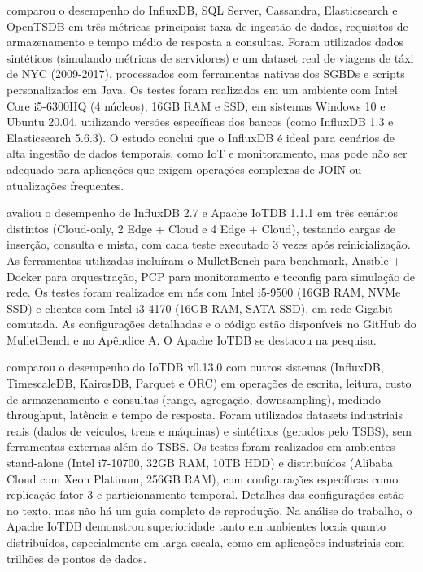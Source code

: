  comparou o desempenho do InfluxDB, SQL Server, Cassandra, Elasticsearch e OpenTSDB em três métricas principais: taxa de ingestão de dados, requisitos de armazenamento e tempo médio de resposta a consultas. Foram utilizados dados sintéticos (simulando métricas de servidores) e um dataset real de viagens de táxi de NYC (2009-2017), processados com ferramentas nativas dos SGBDs e scripts personalizados em Java. Os testes foram realizados em um ambiente com Intel Core i5-6300HQ (4 núcleos), 16GB RAM e SSD, em sistemas Windows 10 e Ubuntu 20.04, utilizando versões específicas dos bancos (como InfluxDB 1.3 e Elasticsearch 5.6.3). O estudo conclui que o InfluxDB é ideal para cenários de alta ingestão de dados temporais, como IoT e monitoramento, mas pode não ser adequado para aplicações que exigem operações complexas de JOIN ou atualizações frequentes.

 avaliou o desempenho de InfluxDB 2.7 e Apache IoTDB 1.1.1 em três cenários distintos (Cloud-only, 2 Edge + Cloud e 4 Edge + Cloud), testando cargas de inserção, consulta e mista, com cada teste executado 3 vezes após reinicialização. As ferramentas utilizadas incluíram o MulletBench para benchmark, Ansible + Docker para orquestração, PCP para monitoramento e tcconfig para simulação de rede. Os testes foram realizados em nós com Intel i5-9500 (16GB RAM, NVMe SSD) e clientes com Intel i3-4170 (16GB RAM, SATA SSD), em rede Gigabit comutada. As configurações detalhadas e o código estão disponíveis no GitHub do MulletBench e no Apêndice A. O Apache IoTDB se destacou na pesquisa.

 comparou o desempenho do IoTDB v0.13.0 com outros sistemas (InfluxDB, TimescaleDB, KairosDB, Parquet e ORC) em operações de escrita, leitura, custo de armazenamento e consultas (range, agregação, downsampling), medindo throughput, latência e tempo de resposta. Foram utilizados datasets industriais reais (dados de veículos, trens e máquinas) e sintéticos (gerados pelo TSBS), sem ferramentas externas além do TSBS. Os testes foram realizados em ambientes stand-alone (Intel i7-10700, 32GB RAM, 10TB HDD) e distribuídos (Alibaba Cloud com Xeon Platinum, 256GB RAM), com configurações específicas como replicação fator 3 e particionamento temporal. Detalhes das configurações estão no texto, mas não há um guia completo de reprodução. Na análise do trabalho, o Apache IoTDB demonstrou superioridade tanto em ambientes locais quanto distribuídos, especialmente em larga escala, como em aplicações industriais com trilhões de pontos de dados.

